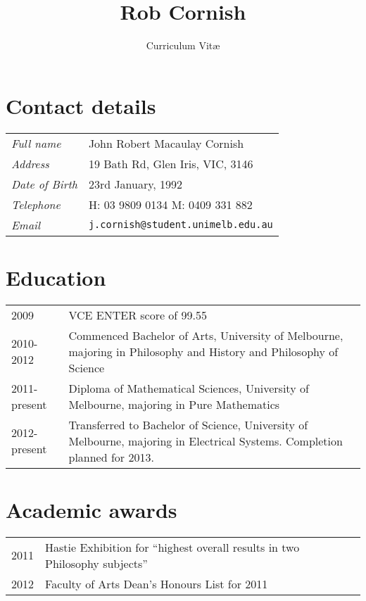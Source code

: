 \documentclass[12pt,a4paper]{article}
\title{\bfseries \huge Rob Cornish}
\author{Curriculum Vit\ae}
\date{}
\newenvironment{labelledlist}
	{\renewcommand{\arraystretch}{1.5}\begin{tabular}{p{3cm} p{12cm}}}
	{\end{tabular}}
\begin{document}
\maketitle
\vspace{-6em}
\thispagestyle{empty}
\vspace{3em}
\section*{Contact details}
\begin{labelledlist}
	\textit{Full name} & John Robert Macaulay Cornish \\
	\textit{Address} & 19 Bath Rd, Glen Iris, VIC, 3146 \\
	\textit{Date of Birth} & 23rd January, 1992 \\
	\textit{Telephone} & H: 03 9809 0134 \newline M: 0409 331 882 \\
	\textit{Email} & \texttt{j.cornish@student.unimelb.edu.au}
\end{labelledlist}

\section*{Education}
\begin{labelledlist}
	2009 & VCE ENTER score of 99.55 \\
	2010-2012 & Commenced Bachelor of Arts, University of Melbourne, majoring in Philosophy and History and Philosophy of Science \\
	2011-present & Diploma of Mathematical Sciences, University of Melbourne, majoring in Pure Mathematics \\
	2012-present & Transferred to Bachelor of Science, University of Melbourne, majoring in Electrical Systems. Completion planned for 2013. \\
\end{labelledlist}

\section*{Academic awards}
\begin{labelledlist}
	2011 & Hastie Exhibition for ``highest overall results in two Philosophy subjects'' \\
	2012 & Faculty of Arts Dean's Honours List for 2011
\end{labelledlist}

\end{document}
